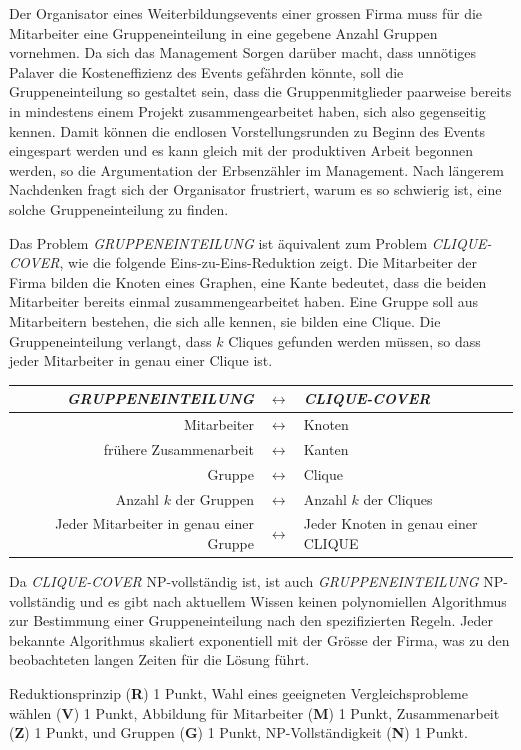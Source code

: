 Der Organisator eines Weiterbildungsevents einer grossen Firma muss für
die Mitarbeiter eine Gruppeneinteilung in eine gegebene Anzahl Gruppen
vornehmen.
Da sich das Management Sorgen darüber macht, dass unnötiges Palaver
die Kosteneffizienz des Events gefährden könnte, soll die Gruppeneinteilung
so gestaltet sein, dass die Gruppenmitglieder paarweise bereits in mindestens
einem Projekt zusammengearbeitet haben, sich also gegenseitig kennen.
Damit können die endlosen Vorstellungsrunden zu Beginn des Events
eingespart werden und es kann gleich mit der produktiven Arbeit begonnen
werden, so die Argumentation der Erbsenzähler im Management.
Nach längerem Nachdenken fragt sich der Organisator frustriert, warum
es so schwierig ist, eine solche Gruppeneinteilung zu finden.

\begin{loesung}
Das Problem \textit{GRUPPENEINTEILUNG} ist äquivalent zum Problem
\textit{CLIQUE-COVER}, wie die folgende Eins-zu-Eins-Reduktion
zeigt.
Die Mitarbeiter der Firma bilden die Knoten eines Graphen, eine
Kante bedeutet, dass die beiden Mitarbeiter bereits einmal zusammengearbeitet
haben.
Eine Gruppe soll aus Mitarbeitern bestehen, die sich alle kennen,
sie bilden eine Clique.
Die Gruppeneinteilung verlangt, dass $k$ Cliques gefunden werden 
müssen, so dass jeder Mitarbeiter in genau einer Clique ist.
\begin{center}
\begin{tabular}{r>{$}c<{$}l}
\textit{GRUPPENEINTEILUNG}&\leftrightarrow&\textit{CLIQUE-COVER}\\
\hline
Mitarbeiter&\leftrightarrow&Knoten\\
frühere Zusammenarbeit&\leftrightarrow&Kanten\\
Gruppe&\leftrightarrow&Clique\\
Anzahl $k$ der Gruppen&\leftrightarrow&Anzahl $k$ der Cliques\\
Jeder Mitarbeiter in genau einer Gruppe&\leftrightarrow&Jeder Knoten in genau einer CLIQUE
\end{tabular}
\end{center}
Da \textit{CLIQUE-COVER} NP-vollständig ist, ist auch
\textit{GRUPPENEINTEILUNG} NP-vollständig und es gibt nach aktuellem
Wissen keinen polynomiellen Algorithmus zur Bestimmung einer Gruppeneinteilung
nach den spezifizierten Regeln.
Jeder bekannte Algorithmus skaliert exponentiell mit der Grösse der
Firma, was zu den beobachteten langen Zeiten für die Lösung führt.
\end{loesung}

\begin{bewertung}
Reduktionsprinzip ({\bf R}) 1 Punkt,
Wahl eines geeigneten Vergleichsprobleme wählen ({\bf V}) 1 Punkt,
Abbildung für Mitarbeiter ({\bf M}) 1 Punkt,
Zusammenarbeit ({\bf Z}) 1 Punkt, und Gruppen ({\bf G}) 1 Punkt,
NP-Vollständigkeit ({\bf N}) 1 Punkt.
\end{bewertung}

